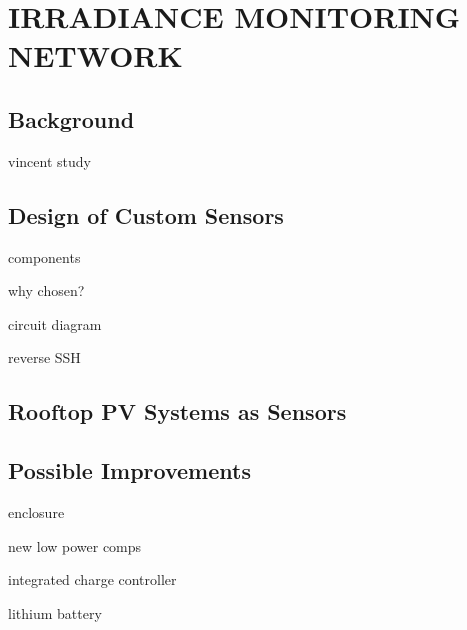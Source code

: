 \chapter{IRRADIANCE MONITORING NETWORK}
\label{chap:sens_net}

\section{Background}

vincent study

\section{Design of Custom Sensors}

components

why chosen?

circuit diagram

reverse SSH

\section{Rooftop PV Systems as Sensors}


\section{Possible Improvements}

enclosure

new low power comps

integrated charge controller

lithium battery






